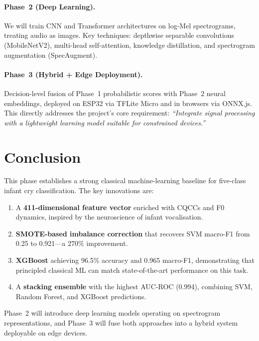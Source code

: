 \documentclass[11pt,a4paper]{article}
\begin{document}
\paragraph{Phase~2 (Deep Learning).}
We will train CNN and Transformer architectures on log-Mel
spectrograms, treating audio as images. Key techniques: depthwise
separable convolutions (MobileNetV2), multi-head self-attention,
knowledge distillation, and spectrogram augmentation (SpecAugment).

\paragraph{Phase~3 (Hybrid + Edge Deployment).}
Decision-level fusion of Phase~1 probabilistic scores with Phase~2
neural embeddings, deployed on ESP32 via TFLite Micro and in browsers
via ONNX.js. This directly addresses the project's core requirement:
\textit{``Integrate signal processing with a lightweight learning
model suitable for constrained devices.''}

\section{Conclusion}
\label{sec:conclusion}

This phase establishes a strong classical machine-learning baseline for
five-class infant cry classification. The key innovations are:

\begin{enumerate}[nosep]
  \item A \textbf{411-dimensional feature vector} enriched with CQCCs
        and F0 dynamics, inspired by the neuroscience of infant
        vocalisation.
  \item \textbf{SMOTE-based imbalance correction} that recovers SVM
        macro-F1 from 0.25 to 0.921---a 270\% improvement.
  \item \textbf{XGBoost} achieving 96.5\% accuracy and
        0.965 macro-F1, demonstrating that principled classical ML can
        match state-of-the-art performance on this task.
  \item A \textbf{stacking ensemble} with the highest AUC-ROC (0.994),
        combining SVM, Random Forest, and XGBoost predictions.
\end{enumerate}

\noindent
Phase~2 will introduce deep learning models operating on spectrogram
representations, and Phase~3 will fuse both approaches into a hybrid
system deployable on edge devices.
\end{document}
